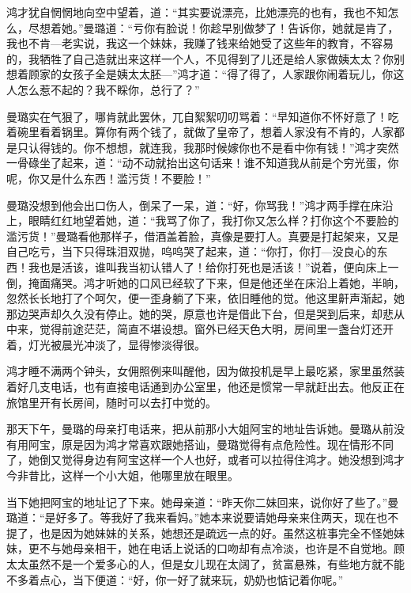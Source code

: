 \par 鸿才犹自惘惘地向空中望着，道：“其实要说漂亮，比她漂亮的也有，我也不知怎么，尽想着她。”曼璐道：“亏你有脸说！你趁早别做梦了！告诉你，她就是肯了，我也不肯—老实说，我这一个妹妹，我赚了钱来给她受了这些年的教育，不容易的，我牺牲了自己造就出来这样一个人，不见得到了儿还是给人家做姨太太？你别想着顾家的女孩子全是姨太太胚—”鸿才道：“得了得了，人家跟你闹着玩儿，你这人怎么惹不起的？我不睬你，总行了？”
\par 曼璐实在气狠了，哪肯就此罢休，兀自絮絮叨叨骂着：“早知道你不怀好意了！吃着碗里看着锅里。算你有两个钱了，就做了皇帝了，想着人家没有不肯的，人家都是只认得钱的。你不想想，就连我，我那时候嫁你也不是看中你有钱！”鸿才突然一骨碌坐了起来，道：“动不动就抬出这句话来！谁不知道我从前是个穷光蛋，你呢，你又是什么东西！滥污货！不要脸！”
\par 曼璐没想到他会出口伤人，倒呆了一呆，道：“好，你骂我！”鸿才两手撑在床沿上，眼睛红红地望着她，道：“我骂了你了，我打你又怎么样？打你这个不要脸的滥污货！”曼璐看他那样子，借酒盖着脸，真像是要打人。真要是打起架来，又是自己吃亏，当下只得珠泪双抛，呜呜哭了起来，道：“你打，你打—没良心的东西！我也是活该，谁叫我当初认错人了！给你打死也是活该！”说着，便向床上一倒，掩面痛哭。鸿才听她的口风已经软了下来，但是他还坐在床沿上着她，半晌，忽然长长地打了个呵欠，便一歪身躺了下来，依旧睡他的觉。他这里鼾声渐起，她那边哭声却久久没有停止。她的哭，原意也许是借此下台，但是哭到后来，却悲从中来，觉得前途茫茫，简直不堪设想。窗外已经天色大明，房间里一盏台灯还开着，灯光被晨光冲淡了，显得惨淡得很。
\par 鸿才睡不满两个钟头，女佣照例来叫醒他，因为做投机是早上最吃紧，家里虽然装着好几支电话，也有直接电话通到办公室里，他还是惯常一早就赶出去。他反正在旅馆里开有长房间，随时可以去打中觉的。
\par 那天下午，曼璐的母亲打电话来，把从前那小大姐阿宝的地址告诉她。曼璐从前没有用阿宝，原是因为鸿才常喜欢跟她搭讪，曼璐觉得有点危险性。现在情形不同了，她倒又觉得身边有阿宝这样一个人也好，或者可以拉得住鸿才。她没想到鸿才今非昔比，这样一个小大姐，他哪里放在眼里。
\par 当下她把阿宝的地址记了下来。她母亲道：“昨天你二妹回来，说你好了些了。”曼璐道：“是好多了。等我好了我来看妈。”她本来说要请她母亲来住两天，现在也不提了，也是因为她妹妹的关系，她想还是疏远一点的好。虽然这桩事完全不怪她妹妹，更不与她母亲相干，她在电话上说话的口吻却有点冷淡，也许是不自觉地。顾太太虽然不是一个爱多心的人，但是女儿现在太阔了，贫富悬殊，有些地方就不能不多着点心，当下便道：“好，你一好了就来玩，奶奶也惦记着你呢。”
